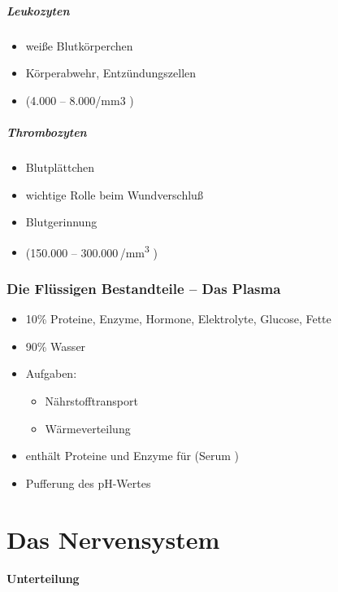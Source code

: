 \subparagraph{Leukozyten}

\begin{itemize}
    \item wei{\ss}e Blutk\"orperchen
    \item K\"orperabwehr, Entz\"undungszellen
    \item (4.000 -- 8.000/mm3 )
\end{itemize}

\subparagraph{Thrombozyten}

\begin{itemize}
    \item {}Blutpl\"attchen
    \item wichtige Rolle beim Wundverschlu{\ss}
    \item Blutgerinnung
    \item (150.000 -- 300.000\,/mm\textsuperscript{3} )
\end{itemize}

\subsubsection{Die Flüssigen Bestandteile --
Das Plasma}

\begin{itemize}
    \item 10\% Proteine, Enzyme, Hormone, Elektrolyte, Glucose, Fette
    \item 90\% Wasser
    \item Aufgaben:
    \begin{itemize}
        \item N\"ahrstofftransport
        \item W\"armeverteilung
    \end{itemize}
    \item enth\"alt Proteine und Enzyme f\"ur
     (Serum )
    \item Pufferung des pH-Wertes
\end{itemize}

\section{Das Nervensystem}

\paragraph{Unterteilung}

